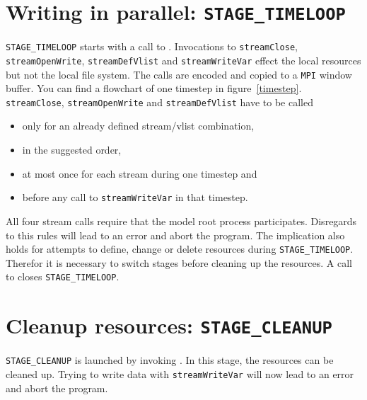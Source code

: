 \section{Writing in parallel: {\tt STAGE\_TIMELOOP}}
\label{STAGETIMELOOP}
{\tt STAGE\_TIMELOOP} starts with a call to {}. 
Invocations to {\CDI} {\tt streamClose},\\
 {\tt streamOpenWrite}, 
{\tt streamDefVlist} and {\tt streamWriteVar} effect the local {\CDI} resources 
but not the local file system. The 
calls are encoded and copied to a {\tt MPI} window buffer. 
You can find a flowchart of one timestep in figure~\ref{timestep}. 
{\tt streamClose}, {\tt streamOpenWrite} and {\tt streamDefVlist} have 
to be called 
\begin{itemize}
\item only for an already defined stream/vlist combination,
\item in the suggested order, 
\item at most once for each stream during one timestep and 
\item before any call to {\tt streamWriteVar} in that timestep. 
\end{itemize}
All four {\CDI} stream calls require that the model root process participates. 
Disregards to this rules will lead to an error and abort the program. The 
implication also holds for attempts to define, change or delete {\CDI} resources 
during {\tt STAGE\_TIMELOOP}. Therefor it is necessary to switch stages before 
cleaning up the resources. A call to 
{} closes 
{\tt STAGE\_TIMELOOP}. 

\section{Cleanup {\CDI} resources: {\tt STAGE\_CLEANUP}}
\label{STAGECLEANUP}
{\tt STAGE\_CLEANUP} is launched by invoking 
{}. In this stage, the {\CDI}
resources can be cleaned up. Trying to write data with {\CDI} 
{\tt streamWriteVar} will now lead to an error and abort the program. 

